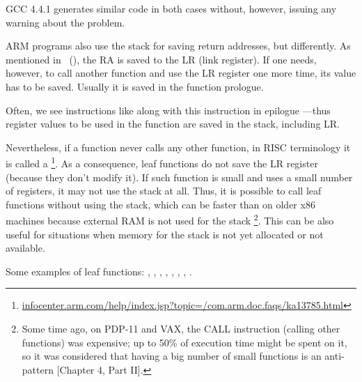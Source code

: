GCC 4.4.1 generates similar code in both cases without, however,  issuing any warning about the problem.


ARM programs also use the stack for saving return addresses, but differently.
As mentioned in \q{\HelloWorldSectionName}~(),
the \ac{RA} is saved to the \ac{LR} (\gls{link register}).
If one needs, however, to call another function and use the \ac{LR} register
one more time, its value has to be saved.
Usually it is saved in the function prologue.

Often, we see instructions like  along with this instruction in epilogue
---thus register values to be used in the function are saved in the stack, including \ac{LR}.

Nevertheless, if a function never calls any other function, in \ac{RISC} terminology it is called a
\footnote{\href{http://go.yurichev.com/17064}{infocenter.arm.com/help/index.jsp?topic=/com.arm.doc.faqs/ka13785.html}}. 
As a consequence, leaf functions do not save the \ac{LR} register (because they don't modify it).
If such function is small and uses a small number of registers, it may not use the stack at all.
Thus, it is possible to call leaf functions without using the stack,
which can be faster than on older x86 machines because external RAM is not used for the stack
\footnote{Some time ago, on PDP-11 and VAX, the CALL instruction (calling other functions) was expensive; up to 50\%
of execution time might be spent on it, so it was considered that having a big number of small functions is an \gls{anti-pattern} [\TAOUP Chapter 4, Part II].}.
This can be also useful for situations when memory for the stack is not yet allocated or not available.

Some examples of leaf functions:
, , 
, , ,
, , .

